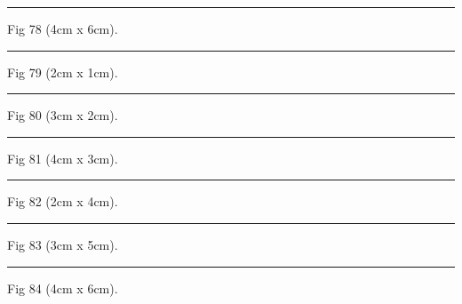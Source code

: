 \documentclass[a4paper,11pt]{article}
\begin{document}
\begin{swarmwrap}%
  \begin{minipage}[t]{4cm}
    \centering
    \rule{\linewidth}{6cm}
    {\footnotesize Fig 78 (4cm x 6cm).}
  \end{minipage}%
\end{swarmwrap}%
\swarmwrapnext
\lipsum[78]%

\begin{swarmwrap}%
  \begin{minipage}[t]{2cm}
    \centering
    \rule{\linewidth}{1cm}
    {\footnotesize Fig 79 (2cm x 1cm).}
  \end{minipage}%
\end{swarmwrap}%
\swarmwrapnext
\lipsum[79]%

\begin{swarmwrap}%
  \begin{minipage}[t]{3cm}
    \centering
    \rule{\linewidth}{2cm}
    {\footnotesize Fig 80 (3cm x 2cm).}
  \end{minipage}%
\end{swarmwrap}%
\swarmwrapnext
\lipsum[80]%

\begin{swarmwrap}%
  \begin{minipage}[t]{4cm}
    \centering
    \rule{\linewidth}{3cm}
    {\footnotesize Fig 81 (4cm x 3cm).}
  \end{minipage}%
\end{swarmwrap}%
\swarmwrapnext
\lipsum[81]%

\begin{swarmwrap}%
  \begin{minipage}[t]{2cm}
    \centering
    \rule{\linewidth}{4cm}
    {\footnotesize Fig 82 (2cm x 4cm).}
  \end{minipage}%
\end{swarmwrap}%
\swarmwrapnext
\lipsum[82]%

\begin{swarmwrap}%
  \begin{minipage}[t]{3cm}
    \centering
    \rule{\linewidth}{5cm}
    {\footnotesize Fig 83 (3cm x 5cm).}
  \end{minipage}%
\end{swarmwrap}%
\swarmwrapnext
\lipsum[83]%

\begin{swarmwrap}%
  \begin{minipage}[t]{4cm}
    \centering
    \rule{\linewidth}{6cm}
    {\footnotesize Fig 84 (4cm x 6cm).}
  \end{minipage}%
\end{swarmwrap}%
\swarmwrapnext
\lipsum[84]%
\end{document}

